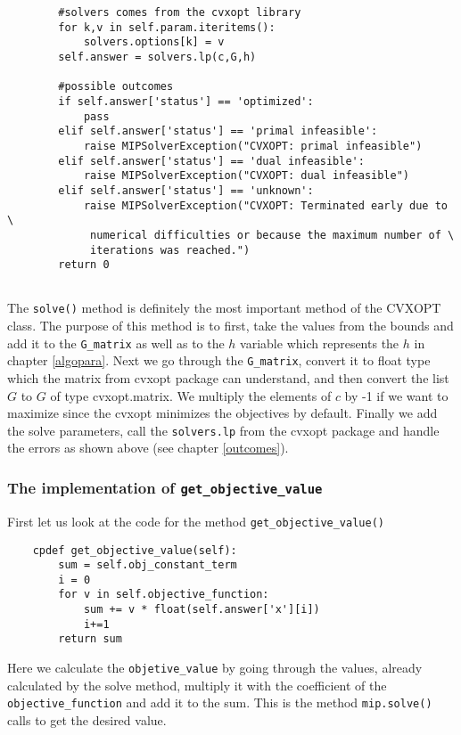 \begin{verbatim}
        #solvers comes from the cvxopt library
        for k,v in self.param.iteritems():
            solvers.options[k] = v
        self.answer = solvers.lp(c,G,h)

        #possible outcomes
        if self.answer['status'] == 'optimized':
            pass
        elif self.answer['status'] == 'primal infeasible':
            raise MIPSolverException("CVXOPT: primal infeasible")
        elif self.answer['status'] == 'dual infeasible':
            raise MIPSolverException("CVXOPT: dual infeasible")
        elif self.answer['status'] == 'unknown':
            raise MIPSolverException("CVXOPT: Terminated early due to \
             numerical difficulties or because the maximum number of \
             iterations was reached.")
        return 0
 
\end{verbatim}

The \texttt{solve()} method is definitely the most important method of the CVXOPT class. The purpose of this method is to first, take the values from the bounds and add it to the \texttt{G\_matrix} as well as to the $h$ variable which represents the $h$ in chapter \ref{algopara}. Next we go through the \texttt{G\_matrix}, convert it to float type which the matrix from cvxopt package can understand, and then convert the list $G$ to $G$ of type cvxopt.matrix. We multiply the elements of $c$ by -1 if we want to maximize since the cvxopt minimizes the objectives by default. Finally we add the solve parameters, call the \texttt{solvers.lp} from the cvxopt package and handle the errors as shown above (see chapter \ref{outcomes}). 

\subsubsection{The implementation of \texttt{get\_objective\_value}}
First let us look at the code for the method \texttt{get\_objective\_value()}
\begin{verbatim}
    cpdef get_objective_value(self):
        sum = self.obj_constant_term
        i = 0
        for v in self.objective_function:
            sum += v * float(self.answer['x'][i])
            i+=1
        return sum
\end{verbatim}

Here we calculate the \texttt{objetive\_value} by going through the values, already calculated by the solve method, multiply it with the coefficient of the \texttt{objective\_function} and add it to the sum. This is the method \texttt{mip.solve()} calls to get the desired value. 


